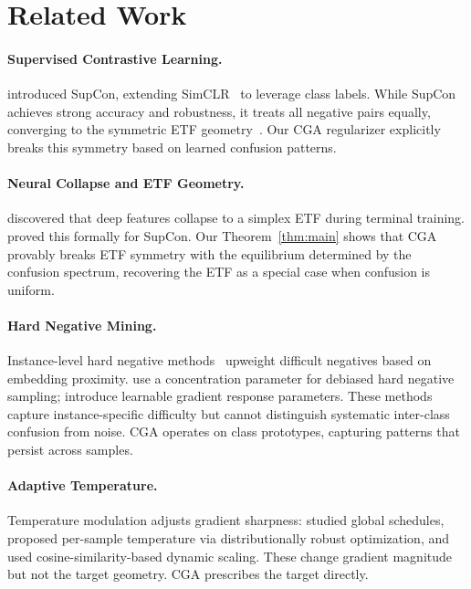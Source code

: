 \documentclass{article}
\begin{document}
\section{Related Work}
\label{sec:related}

\paragraph{Supervised Contrastive Learning.}
\citet{khosla2020supervised} introduced SupCon, extending SimCLR~\citep{chen2020simple} to leverage class labels. While SupCon achieves strong accuracy and robustness, it treats all negative pairs equally, converging to the symmetric ETF geometry~\citep{lee2025theoretical}. Our CGA regularizer explicitly breaks this symmetry based on learned confusion patterns.

\paragraph{Neural Collapse and ETF Geometry.}
\citet{papyan2020prevalence} discovered that deep features collapse to a simplex ETF during terminal training. \citet{lee2025theoretical} proved this formally for SupCon. Our Theorem~\ref{thm:main} shows that CGA provably breaks ETF symmetry with the equilibrium determined by the confusion spectrum, recovering the ETF as a special case when confusion is uniform.

\paragraph{Hard Negative Mining.}
Instance-level hard negative methods~\citep{robinson2021contrastive, kalantidis2020hard, animesh2025tuned} upweight difficult negatives based on embedding proximity. \citet{robinson2021contrastive} use a concentration parameter for debiased hard negative sampling; \citet{animesh2025tuned} introduce learnable gradient response parameters. These methods capture instance-specific difficulty but cannot distinguish systematic inter-class confusion from noise. CGA operates on class prototypes, capturing patterns that persist across samples.

\paragraph{Adaptive Temperature.}
Temperature modulation adjusts gradient sharpness: \citet{kukleva2023temperature} studied global schedules, \citet{qiu2023not} proposed per-sample temperature via distributionally robust optimization, and \citet{zhang2024dynamically} used cosine-similarity-based dynamic scaling. These change gradient magnitude but not the target geometry. CGA prescribes the target directly.
\end{document}
